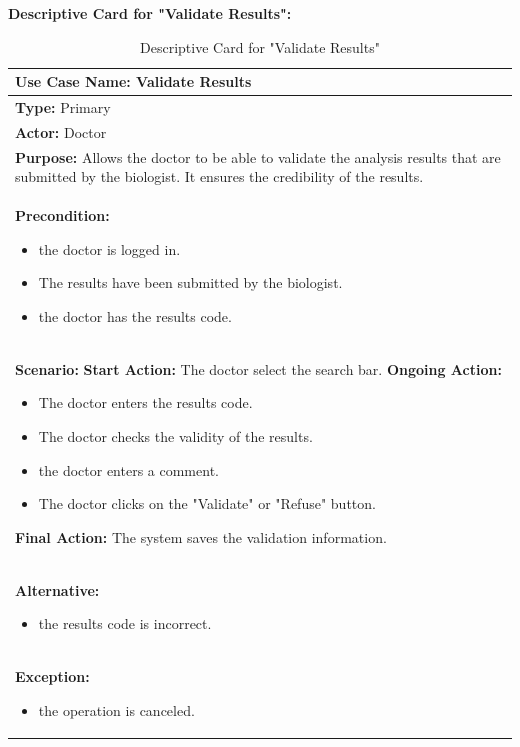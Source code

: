 \documentclass{article}
\begin{document}
\newpage

\textbf{Descriptive Card for "Validate Results":}

\begin{table}[h]
\setlength{\tabcolsep}{10pt}
\renewcommand{\arraystretch}{1.5}
    \begin{tabular}{|p{\linewidth}|}
        \hline
        \textbf{Use Case Name:} Validate Results\\ 
        \hline
        \textbf{Type:} Primary\\ 
        \hline
        \textbf{Actor:} Doctor\\ 
        \hline
        \textbf{Purpose:} Allows the doctor to be able to validate the analysis results that are submitted by the biologist.
        It ensures the credibility of the results.\\ 
        \hline
        \textbf{Precondition:}
        \begin{itemize}
            \item the doctor is logged in.
            \item The results have been submitted by the biologist.
            \item the doctor has the results code.
        \end{itemize}\\ 
        \hline
        \textbf{Scenario:}
        \vspace{0.2cm}
        \newline
        \vspace{0.2cm}
        \textbf{Start Action:} The doctor select the search bar.
        \newline
        \textbf{Ongoing Action:}  
        \begin{itemize}
            \item The doctor enters the results code.
            \item The doctor checks the validity of the results.
            \item the doctor enters a comment.
            \item The doctor clicks on the "Validate" or "Refuse" button.
        \end{itemize}
        \textbf{Final Action:} The system saves the validation information.\\
        \hline
        \textbf{Alternative:} 
        \begin{itemize}
            \item the results code is incorrect.
        \end{itemize}\\ 
        \hline
        \textbf{Exception:}
        \begin{itemize}
            \item the operation is canceled. 
        \end{itemize}\\ 
        \hline
    \end{tabular}
    \caption{Descriptive Card for "Validate Results"}
    \label{tab:my-table}
\end{table}
\end{document}

